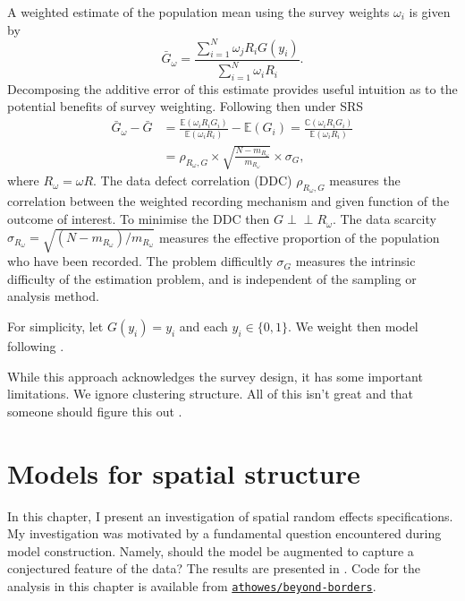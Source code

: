 \documentclass[a4paper, nobind]{templates/ociamthesis}
\begin{document}
A weighted estimate \autocite{hajek1971discussion} of the population mean using the survey weights \(\omega_i\) is given by
\begin{equation}
\bar G_\omega = \frac{\sum_{i = 1}^N \omega_j R_i G(y_i)}{\sum_{i = 1}^N \omega_i R_i}. \label{eq:hajek}
\end{equation}
Decomposing the additive error of this estimate provides useful intuition as to the potential benefits of survey weighting.
Following \textcite{meng2018statistical} then under SRS
\begin{align}
\bar G_\omega - \bar G &= \frac{\mathbb{E}(\omega_i R_i G_i)}{\mathbb{E}(\omega_i R_i)} - \mathbb{E}(G_i) = \frac{\mathbb{C}(\omega_i R_i G_i)}{\mathbb{E}(\omega_i R_i)} \\ 
&= \rho_{R_\omega, G} \times \sqrt{\frac{N - m_{R_\omega}}{m_{R_\omega}}} \times \sigma_G,
\end{align}
where \(R_\omega = \omega R\).
The data defect correlation (DDC) \(\rho_{R_\omega, G}\) measures the correlation between the weighted recording mechanism and given function of the outcome of interest.
To minimise the DDC then \(G \perp \!\!\! \perp R_\omega\).
The data scarcity \(\sigma_{R_\omega} = \sqrt{(N - m_{R_\omega})/m_{R_\omega}}\) measures the effective proportion of the population who have been recorded.
The problem difficultly \(\sigma_G\) measures the intrinsic difficulty of the estimation problem, and is independent of the sampling or analysis method.

For simplicity, let \(G(y_i) = y_i\) and each \(y_i \in \{0, 1\}\).
We weight then model following \textcite{chen2014use}.

While this approach acknowledges the survey design, it has some important limitations.
We ignore clustering structure.
All of this isn't great and that someone should figure this out \autocite{gelman2007struggles}.

\hypertarget{beyond-borders}{%
\chapter{Models for spatial structure}\label{beyond-borders}}

\adjustmtc
{}

In this chapter, I present an investigation of spatial random effects specifications.
My investigation was motivated by a fundamental question encountered during model construction.
Namely, should the model be augmented to capture a conjectured feature of the data?
The results are presented in \textcite{howes2023beyond}.
Code for the analysis in this chapter is available from \href{https://github.com/athowes/beyond-borders}{\texttt{athowes/beyond-borders}}.
\end{document}
